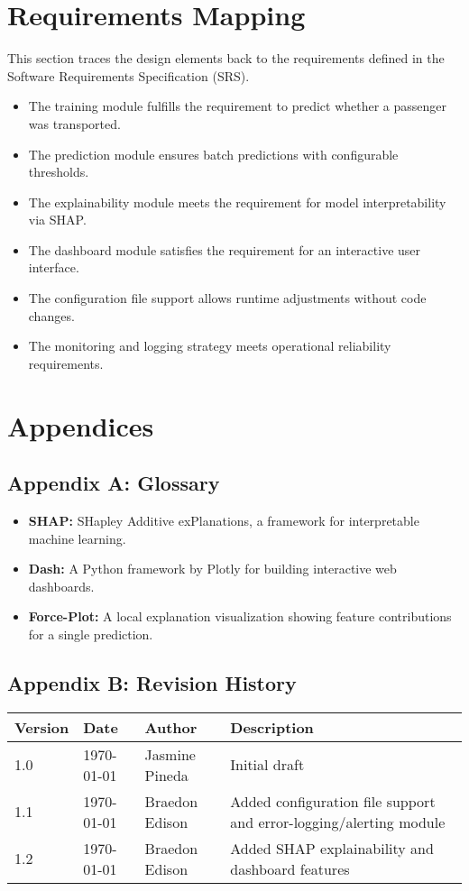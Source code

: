 \documentclass[15pt]{article}
\begin{document}
\section{Requirements Mapping}
This section traces the design elements back to the requirements defined in the Software Requirements Specification (SRS).

\begin{itemize}
    \item The training module fulfills the requirement to predict whether a passenger was transported.
    \item The prediction module ensures batch predictions with configurable thresholds.
    \item The explainability module meets the requirement for model interpretability via SHAP.
    \item The dashboard module satisfies the requirement for an interactive user interface.
    \item The configuration file support allows runtime adjustments without code changes.
    \item The monitoring and logging strategy meets operational reliability requirements.
\end{itemize}

\section{Appendices}

\subsection{Appendix A: Glossary}

\begin{itemize}
    \item \textbf{SHAP:} SHapley Additive exPlanations, a framework for interpretable machine learning.
    \item \textbf{Dash:} A Python framework by Plotly for building interactive web dashboards.
    \item \textbf{Force-Plot:} A local explanation visualization showing feature contributions for a single prediction.
\end{itemize}

\subsection{Appendix B: Revision History}
\begin{tabular}{|l|l|l|l|}
\hline
Version & Date & Author & Description \\
\hline
1.0 & \today & Jasmine Pineda & Initial draft \\
\hline
1.1 & \today & Braedon Edison & Added configuration file support and error-logging/alerting module \\
\hline
1.2 & \today & Braedon Edison & Added SHAP explainability and dashboard features \\
\hline
\end{tabular}
\end{document}
